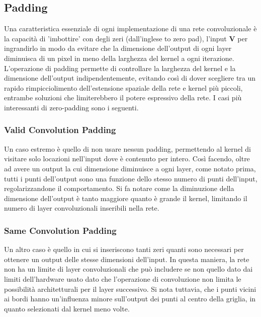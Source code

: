 \documentclass[12pt,a4paper]{report}
\begin{document}
    \subsection{Padding}
    Una caratteristica essenziale di ogni implementazione di una
    rete convoluzionale \`e la capacit\`a di 'imbottire' con degli
    zeri (dall'inglese to zero pad), l'input $\boldsymbol{V}$ per
    ingrandirlo in modo da evitare che la dimensione dell'output di
    ogni layer diminuisca di un pixel in meno della larghezza del
    kernel a ogni iterazione. L'operazione di padding permette di 
    controllare la larghezza del kernel e la dimensione dell'output
    indipendentemente, evitando cos\`i di dover scegliere tra un 
    rapido rimpicciolimento dell'estensione spaziale della rete e 
    kernel pi\`u piccoli, entrambe soluzioni che limiterebbero il
    potere espressivo della rete. I casi pi\`u interessanti di 
    zero-padding sono i seguenti.

    \subsubsection{Valid Convolution Padding}
    Un caso estremo \`e quello di non usare nessun padding, 
    permettendo al kernel di visitare solo locazioni nell'input 
    dove \`e contenuto per intero. Cos\`i facendo, oltre ad avere 
    un output la cui dimensione diminuisce a ogni layer, come 
    notato prima, tutti i punti dell'output sono una funzione dello
    stesso numero di punti dell'input, regolarizzandone il 
    comportamento. Si fa notare come la diminuzione della 
    dimensione dell'output \`e tanto maggiore quanto \`e grande il
    kernel, limitando il numero di layer convoluzionali inseribili
    nella rete.

    \subsubsection{Same Convolution Padding}
    Un altro caso \`e quello in cui si inseriscono tanti zeri
    quanti sono necessari per ottenere un output delle stesse 
    dimensioni dell'input. In questa maniera, la rete non ha un 
    limite di layer convoluzionali che pu\`o includere se non 
    quello dato dai limiti dell'hardware usato dato che 
    l'operazione di convoluzione non limita le possibilit\`a 
    architetturali per il layer successivo. Si nota tuttavia, che i
    punti vicini ai bordi hanno un'influenza minore sull'output
    dei punti al centro della griglia, in quanto selezionati dal
    kernel meno volte.
\end{document}
